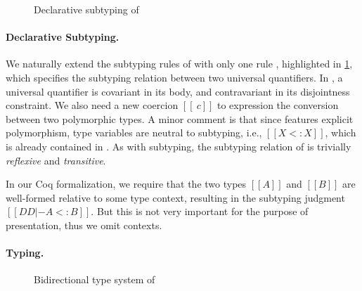 \begin{figure}[t]
  \centering
  \caption{Declarative subtyping of \fnamee}
  \label{fig:subtype_decl:fi}
\end{figure}

\paragraph{Declarative Subtyping.}


We naturally extend the subtyping rules of \namee with only one rule
, highlighted in \cref{fig:subtype_decl:fi}, which specifies the
subtyping relation between two universal quantifiers. In , a
universal quantifier is covariant in its body, and contravariant in its
disjointness constraint. We also need a new coercion $[[ \ c ]]$ to expression the
conversion between two polymorphic types.
A minor comment is that since
\fnamee features explicit polymorphism, type variables are neutral to subtyping,
i.e., $[[X <: X]]$, which is already contained in . As with \namee
subtyping, the subtyping relation of \fnamee is trivially \textit{reflexive} and
\textit{transitive}.

\begin{remark}
  In our Coq formalization, we require that the two types $[[A]]$ and $[[B]]$ are
  well-formed relative to some type context, resulting in the subtyping
  judgment $[[DD |- A <: B]]$. But this is not very important
  for the purpose of presentation, thus we omit contexts.
\end{remark}


\paragraph{Typing.}

\begin{figure}
  \centering
  \caption{Bidirectional type system of \fnamee}
  \label{fig:typing:fi}
\end{figure}



